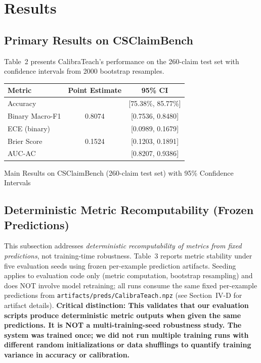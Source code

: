 \section{Results}\label{results}

\subsection{Primary Results on CSClaimBench}\label{primary-results-on-csclaimbench}

Table~2 presents CalibraTeach's performance on the 260-claim test set with confidence intervals from 2000 bootstrap resamples.

\protect{}\label{tab:main_results}
{\def\LTcaptype{none} %
\begin{longtable}[]{@{}lcc@{}}
\toprule\noalign{}
\textbf{Metric} & \textbf{Point Estimate} & \textbf{95\% CI} \\
\midrule\noalign{}
\endhead
\bottomrule\noalign{}
\endlastfoot
Accuracy & & {[}75.38\%, 85.77\%{]} \\
Binary Macro-F1 & 0.8074 & {[}0.7536, 0.8480{]} \\
ECE (binary) & & {[}0.0989, 0.1679{]} \\
Brier Score & 0.1524 & {[}0.1203, 0.1891{]} \\
AUC-AC & & {[}0.8207, 0.9386{]} \\
\end{longtable}
}

Main Results on CSClaimBench (260-claim test set) with 95\% Confidence Intervals

\subsection{Deterministic Metric Recomputability (Frozen Predictions)}\label{deterministic-metric-recomputability-frozen-predictions}

This subsection addresses \emph{deterministic recomputability of metrics from fixed predictions}, not training-time robustness. Table~3 reports metric stability under five evaluation seeds using frozen per-example prediction artifacts. Seeding applies to evaluation code only (metric computation, bootstrap resampling) and does NOT involve model retraining; all runs consume the same fixed per-example predictions from \texttt{artifacts/preds/CalibraTeach.npz} (see Section~IV-D for artifact details). \textbf{Critical distinction: This validates that our evaluation scripts produce deterministic metric outputs when given the same predictions. It is NOT a multi-training-seed robustness study. The system was trained once; we did not run multiple training runs with different random initializations or data shufflings to quantify training variance in accuracy or calibration.}

